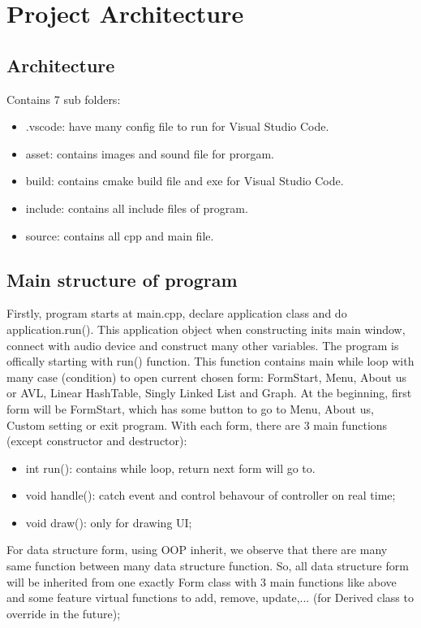 \section{Project Architecture}
\subsection{Architecture}
    Contains 7 sub folders:
    \begin{itemize}
        \item .vscode: have many config file to run for Visual Studio Code.
        \item asset: contains images and sound file for prorgam.
        \item build: contains cmake build file and exe for Visual Studio Code.
        \item include: contains all include files of program.
        \item source: contains all cpp and main file.
    \end{itemize}
\subsection{Main structure of program}
    Firstly, program starts at main.cpp, declare application class and do application.run().
    This application object when constructing inits main window, connect with audio device and construct many other variables.
    The program is offically starting with run() function. This function contains main while loop with many case (condition) to open current chosen form: FormStart, Menu, About us or AVL, Linear HashTable, Singly Linked List and Graph.
    At the beginning, first form will be FormStart, which has some button to go to Menu, About us, Custom setting or exit program.
    With each form, there are 3 main functions (except constructor and destructor): 
    \begin{itemize}
        \item  int run(): contains while loop, return next form will go to.
        \item void handle(): catch event and control behavour of controller on real time;
        \item void draw(): only for drawing UI;
    \end{itemize}
    For data structure form, using OOP inherit, we observe that there are many same function between many data structure function. So, all data structure form will be inherited from one exactly Form class with 3 main functions like above and some feature virtual functions to add, remove, update,... (for Derived class to override in the future);
    
